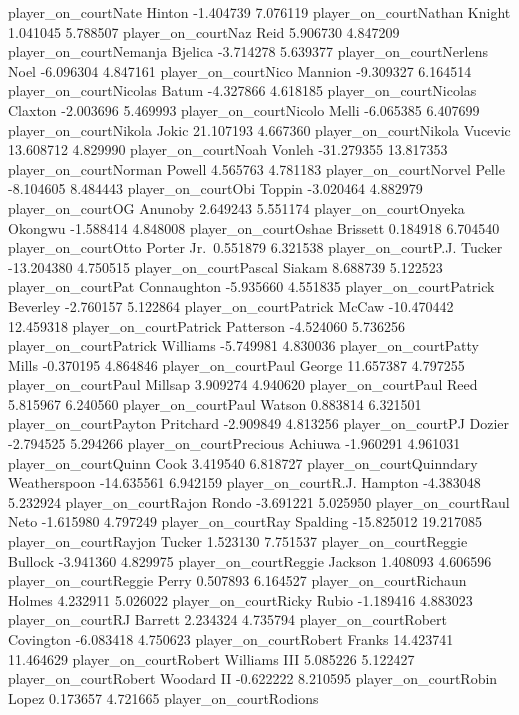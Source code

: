\documentclass[
  landscape]{article}
\begin{document}
player\_on\_courtNate Hinton -1.404739 7.076119 player\_on\_courtNathan
Knight 1.041045 5.788507 player\_on\_courtNaz Reid 5.906730 4.847209
player\_on\_courtNemanja Bjelica -3.714278 5.639377
player\_on\_courtNerlens Noel -6.096304 4.847161 player\_on\_courtNico
Mannion -9.309327 6.164514 player\_on\_courtNicolas Batum -4.327866
4.618185 player\_on\_courtNicolas Claxton -2.003696 5.469993
player\_on\_courtNicolo Melli -6.065385 6.407699 player\_on\_courtNikola
Jokic 21.107193 4.667360 player\_on\_courtNikola Vucevic 13.608712
4.829990 player\_on\_courtNoah Vonleh -31.279355 13.817353
player\_on\_courtNorman Powell 4.565763 4.781183 player\_on\_courtNorvel
Pelle -8.104605 8.484443 player\_on\_courtObi Toppin -3.020464 4.882979
player\_on\_courtOG Anunoby 2.649243 5.551174 player\_on\_courtOnyeka
Okongwu -1.588414 4.848008 player\_on\_courtOshae Brissett 0.184918
6.704540 player\_on\_courtOtto Porter Jr.~0.551879 6.321538
player\_on\_courtP.J. Tucker -13.204380 4.750515 player\_on\_courtPascal
Siakam 8.688739 5.122523 player\_on\_courtPat Connaughton -5.935660
4.551835 player\_on\_courtPatrick Beverley -2.760157 5.122864
player\_on\_courtPatrick McCaw -10.470442 12.459318
player\_on\_courtPatrick Patterson -4.524060 5.736256
player\_on\_courtPatrick Williams -5.749981 4.830036
player\_on\_courtPatty Mills -0.370195 4.864846 player\_on\_courtPaul
George 11.657387 4.797255 player\_on\_courtPaul Millsap 3.909274
4.940620 player\_on\_courtPaul Reed 5.815967 6.240560
player\_on\_courtPaul Watson 0.883814 6.321501 player\_on\_courtPayton
Pritchard -2.909849 4.813256 player\_on\_courtPJ Dozier -2.794525
5.294266 player\_on\_courtPrecious Achiuwa -1.960291 4.961031
player\_on\_courtQuinn Cook 3.419540 6.818727 player\_on\_courtQuinndary
Weatherspoon -14.635561 6.942159 player\_on\_courtR.J. Hampton -4.383048
5.232924 player\_on\_courtRajon Rondo -3.691221 5.025950
player\_on\_courtRaul Neto -1.615980 4.797249 player\_on\_courtRay
Spalding -15.825012 19.217085 player\_on\_courtRayjon Tucker 1.523130
7.751537 player\_on\_courtReggie Bullock -3.941360 4.829975
player\_on\_courtReggie Jackson 1.408093 4.606596
player\_on\_courtReggie Perry 0.507893 6.164527 player\_on\_courtRichaun
Holmes 4.232911 5.026022 player\_on\_courtRicky Rubio -1.189416 4.883023
player\_on\_courtRJ Barrett 2.234324 4.735794 player\_on\_courtRobert
Covington -6.083418 4.750623 player\_on\_courtRobert Franks 14.423741
11.464629 player\_on\_courtRobert Williams III 5.085226 5.122427
player\_on\_courtRobert Woodard II -0.622222 8.210595
player\_on\_courtRobin Lopez 0.173657 4.721665 player\_on\_courtRodions
\end{document}
